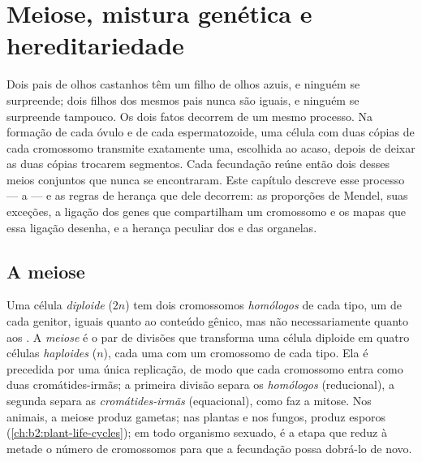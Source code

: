 \chapter{Meiose, mistura genética e hereditariedade}\label{ch:b2:meiosis-heredity}

Dois pais de olhos castanhos têm um filho de olhos azuis, e ninguém se
surpreende; dois filhos dos mesmos pais nunca são iguais, e ninguém se
surpreende tampouco. Os dois fatos decorrem de um mesmo processo. Na
formação de cada óvulo e de cada espermatozoide, uma célula com duas
cópias de cada cromossomo transmite exatamente uma, escolhida ao
acaso, depois de deixar as duas cópias trocarem segmentos. Cada
fecundação reúne então dois desses meios conjuntos que nunca se
encontraram. Este capítulo descreve esse processo --- a  --- e as
regras de herança que dele decorrem: as proporções de Mendel, suas
exceções, a ligação dos genes que compartilham um cromossomo e os
mapas que essa ligação desenha, e a herança peculiar dos  e das organelas.

\section{A meiose}

\begin{definition}[Meiose]\label{def:b2:meiosis-heredity:meiosis}
Uma célula \emph{diploide} ($2n$) tem dois cromossomos
\emph{homólogos} de cada tipo, um de cada genitor, iguais quanto ao
conteúdo gênico, mas não necessariamente quanto aos . A
\emph{meiose} é o par de divisões que transforma uma célula diploide
em quatro células \emph{haploides} ($n$), cada uma com um cromossomo de
cada tipo. Ela é precedida por uma única replicação, de modo que cada
cromossomo entra como duas cromátides-irmãs; a primeira divisão separa
os \emph{homólogos} (reducional), a segunda separa as
\emph{cromátides-irmãs} (equacional), como faz a mitose. Nos animais,
a meiose produz gametas; nas plantas e nos fungos, produz esporos
(\cref{ch:b2:plant-life-cycles}); em todo organismo sexuado, é a etapa que reduz à metade o
número de cromossomos para que a fecundação possa dobrá-lo de novo.
\end{definition}

